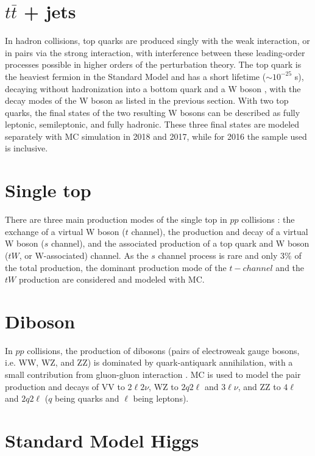 \section{$t\bar{t}$ + jets}
In hadron collisions, top quarks are produced singly with the weak interaction, or in pairs via the strong interaction, with interference between these leading-order processes possible in higher orders of the perturbation theory. 
The top quark is the heaviest fermion in the Standard Model and has a short lifetime ($\sim 10^{-25}$ s), decaying without hadronization into a bottom quark and a W boson \cite{workman_review_2022}, with the decay modes of the W boson as listed in the previous section. With two top quarks, the final states of the two resulting W bosons can be described as fully leptonic, semileptonic, and fully hadronic. These three final states are modeled separately with MC simulation in 2018 and 2017, while for 2016 the sample used is inclusive.

\section{Single top}
There are three main production modes of the single top in $pp$ collisions \cite{CMS-CR-2018-185}: the exchange of a virtual W boson ($t$ channel), the production and decay of a virtual W boson ($s$ channel), and the associated production of a top quark and W boson ($tW$, or W-associated) channel. As the $s$ channel process is rare and only 3\% of the total production, the dominant production mode of the $t-channel$ and the $tW$ production are considered and modeled with MC. 

\section{Diboson}

In $pp$ collisions, the production of dibosons (pairs of electroweak gauge bosons, i.e. WW, WZ, and ZZ) is dominated by quark-antiquark annihilation, with a small contribution from gluon-gluon interaction \cite{CMS-SMP-20-012}. MC is used to model the pair production and decays of VV to $2\ell 2\nu$, WZ to $2q 2\ell$ and $3 \ell \nu$, and ZZ to $4\ell$ and $2q 2\ell$ ($q$ being quarks and $\ell$ being leptons).

\section{Standard Model Higgs}

